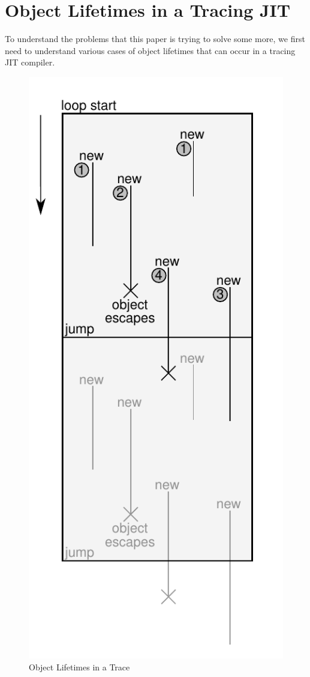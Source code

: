 \documentclass{sigplanconf}
\begin{document}
\section{Object Lifetimes in a Tracing JIT}
\label{sec:lifetimes}


To understand the problems that this paper is trying to solve some more, we
first need to understand various cases of object lifetimes that can occur in a
tracing JIT compiler.

\begin{figure}
\begin{center}
\includegraphics[scale=0.6]{figures/obj-lifetime.pdf}
\end{center}

\caption{Object Lifetimes in a Trace}
\label{fig:lifetimes}
\end{figure}
\end{document}
